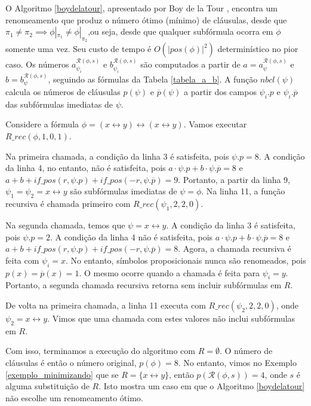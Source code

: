 O Algoritmo \ref{boydelatour}, apresentado por Boy de la Tour \cite{de1992optimality}, encontra um renomeamento que produz o número ótimo (mínimo) de cláusulas, desde que $\pi_1 \neq \pi_2 \implies \phi|_{\pi_1} \neq \phi|_{\pi_2}$,\break ou seja, desde que qualquer subfórmula ocorra em $\phi$ somente uma vez. Seu custo de tempo é $O(|pos(\phi)|^2)$ determinístico no pior caso. Os números $a_{\psi_i}^{\mathcal{R}(\phi,s)}$ e $b_{\psi_i}^{\mathcal{R}(\phi,s)}$ são computados a partir de $a = a_\psi^{\mathcal{R}(\phi,s)}$ e $b = b_\psi^{\mathcal{R}(\phi,s)}$, seguindo as fórmulas da Tabela \ref{tabela_a_b}. A função $nbcl(\psi)$ calcula os números de cláusulas $p(\psi)$ e $\overline{p}(\psi)$ a partir dos campos $\psi_i.p$ e $\psi_i.\overline{p}$ das subfórmulas imediatas de $\psi$.

\begin{example}
	Considere a fórmula $\phi = (x \leftrightarrow y) \leftrightarrow (x \leftrightarrow y)$. Vamos executar $R\_rec(\phi,1,0,1)$.
	
	Na primeira chamada, a condição da linha 3 é satisfeita, pois $\psi.p = 8$. A condição da linha 4, no entanto, não é satisfeita, pois $a \cdot \psi.p + b \cdot \psi.\overline{p} = 8$ e $a + b + if\_pos(r,\psi.p) + if\_pos(-r,\psi.\overline{p}) = 9$. Portanto, a partir da linha 9, $\psi_1 = \psi_2 = x \leftrightarrow y$ são subfórmulas imediatas de $\psi = \phi$. Na linha 11, a função recursiva é chamada primeiro com $R\_rec(\psi_1,2,2,0)$.
	
	Na segunda chamada, temos que $\psi = x \leftrightarrow y$. A condição da linha 3 é satisfeita, pois $\psi.p = 2$. A condição da linha 4 não é satisfeita, pois $a \cdot \psi.p + b \cdot \psi.\overline{p} = 8$ e $a + b + if\_pos(r,\psi.p) + if\_pos(-r,\psi.\overline{p}) = 8$. Agora, a chamada recursiva é feita com $\psi_i = x$. No entanto, símbolos proposicionais nunca são renomeados, pois $p(x) = \overline{p}(x) = 1$. O mesmo ocorre quando a chamada é feita para $\psi_i = y$. Portanto, a segunda chamada recursiva retorna sem incluir subfórmulas em $R$.
	
	De volta na primeira chamada, a linha 11 executa com $R\_rec(\psi_2,2,2,0)$, onde $\psi_2 = x \leftrightarrow y$. Vimos que uma chamada com estes valores não inclui subfórmulas em $R$.
	
	Com isso, terminamos a execução do algoritmo com $R = \emptyset$. O número de cláusulas é então o número original, $p(\phi) = 8$. No entanto, vimos no Exemplo \ref{exemplo_minimizando} que se $R = \{x \leftrightarrow y\}$, então $p(\mathcal{R}(\phi,s)) = 4$, onde $s$ é alguma substituição de $R$. Isto mostra um caso em que o Algoritmo \ref{boydelatour} não escolhe um renomeamento ótimo.
\end{example}

